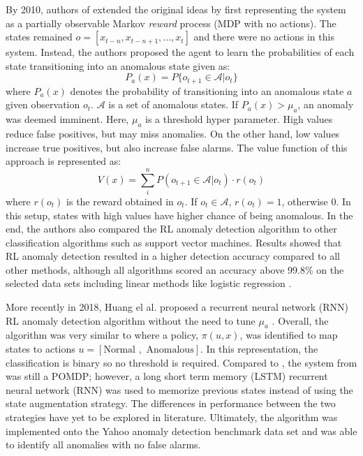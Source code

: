 By 2010, authors of \cite{seq_anomaly2} extended the original ideas by first representing the system as a partially observable Markov \textit{reward} process (MDP with no actions). The states remained $o = [x_{t-n}, x_{t-n+1}, ..., x_{t}]$ and there were no actions in this system. Instead, the authors proposed the agent to learn the probabilities of each state transitioning into an anomalous state given as:
\begin{equation}
    P_a(x) = P\{o_{t+1} \in \mathcal{A} | o_t\}
\end{equation}
where $P_a(x)$ denotes the probability of transitioning into an anomalous state $a$ given observation $o_t$. $\mathcal{A}$ is a set of anomalous states. If $P_a(x) > \mu_a$, an anomaly was deemed imminent. Here, $\mu_a$ is a threshold hyper parameter. High values reduce false positives, but may miss anomalies. On the other hand, low values increase true positives, but also increase false alarms. The value function of this approach is represented as:
\begin{equation}
    V(x) = \sum\limits_i^n P(o_{t+1} \in \mathcal{A} | o_t) \cdot r(o_t)
\end{equation}
where $r(o_t)$ is the reward obtained in $o_t$. If $o_t \in \mathcal{A}$, $r(o_t) = 1$, otherwise 0. In this setup, states with high values have higher chance of being anomalous. In the end, the authors also compared the RL anomaly detection algorithm to other classification algorithms such as support vector machines.  Results showed that RL anomaly detection resulted in a higher detection accuracy compared to all other methods, although all algorithms scored an accuracy above 99.8\% on the selected data sets including linear methods like logistic regression \cite{seq_anomaly2}.
 
More recently in 2018, Huang el al. proposed a recurrent neural network (RNN) RL anomaly detection algorithm without the need to tune $\mu_a$ \cite{seq_anomaly3}. Overall, the algorithm was very similar to \cite{seq_anomaly1} where a policy, $\pi(u, x)$, was identified to map states to actions $u = [\text{Normal }, \text{ Anomalous}]$.  In this representation, the classification is binary so no threshold is required. Compared to \cite{seq_anomaly1}, the system from \cite{seq_anomaly3} was still a POMDP; however, a long short term memory (LSTM) recurrent neural network (RNN) was used to memorize previous states instead of using the state augmentation strategy. The differences in performance between the two strategies have yet to be explored in literature. Ultimately, the algorithm was implemented onto the Yahoo anomaly detection benchmark data set \cite{yahoo} and was able to identify all anomalies with no false alarms.














